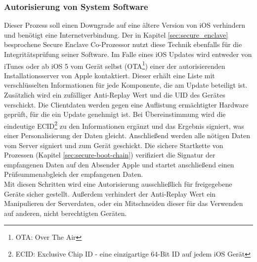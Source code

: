 	\subsubsection{Autorisierung von System Software}\label{sec:code-signing}
		Dieser Prozess soll einen Downgrade auf eine ältere Version von iOS
		verhindern und benötigt eine Internetverbindung. Der in Kapitel
		\ref{sec:secure_enclave} besprochene Secure Enclave Co-Prozessor nutzt diese
		Technik ebenfalls für die Integritätsprüfung seiner Software. Im Falle eines
		iOS Updates wird entweder von iTunes oder ab iOS 5 vom Gerät selbst
		(OTA\footnote{OTA: Over The Air}) einer der autorisierenden
		Installationsserver von Apple kontaktiert. Dieser erhält eine Liste mit
		verschlüsselten Informationen für jede Komponente, die am Update beteiligt
		ist.
		Zusätzlich wird ein zufälliger Anti-Replay Wert und die UID des Gerätes
		verschickt. Die Clientdaten werden gegen eine Auflistung ermächtigter
		Hardware geprüft, für die ein Update genehmigt ist. Bei
		Übereinstimmung wird die eindeutige ECID\footnote{ECID: Exclusive Chip ID - eine einzigartige
		64-Bit ID auf jedem iOS Gerät} zu den Informationen ergänzt und das
		Ergebnis signiert, was einer Personalisierung der Daten gleicht.
		Anschließend werden alle nötigen Daten vom Server signiert und zum Gerät
		geschickt. Die sichere Startkette von Prozessen (Kapitel
		\ref{sec:secure-boot-chain}) verifiziert die Signatur der empfangenen Daten
		auf den Absender Apple und startet anschließend einen Prüfsummenabgleich
		der empfangenen Daten.\\
		Mit diesen Schritten wird eine Autorisierung ausschließlich für freigegebene
		Geräte sicher gestellt. Außerdem verhindert der Anti-Replay Wert ein
		Manipulieren der Serverdaten, oder ein Mitschneiden dieser für
		das Verwenden auf anderen, nicht berechtigten Geräten.
		
